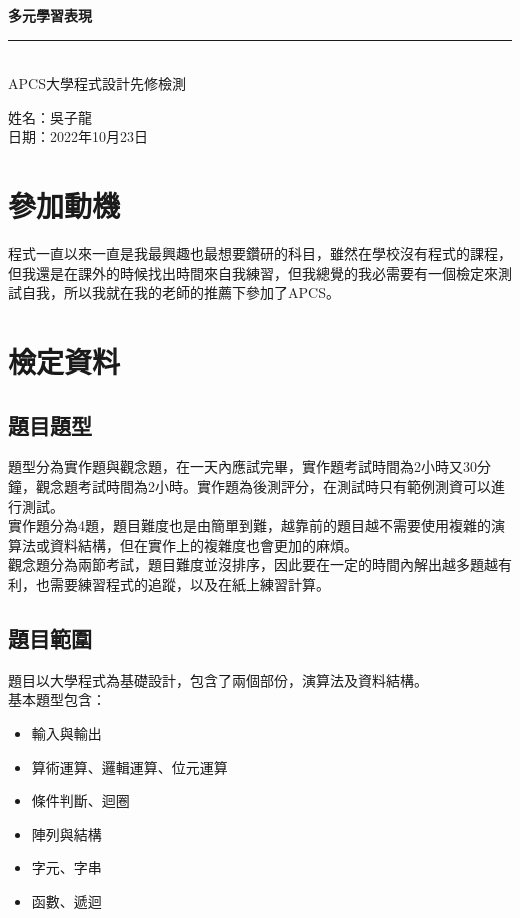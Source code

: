 \documentclass[a4paper, 18pt]{article}
\begin{document}
\begin{center}

\vspace*{7cm}
\Huge \textbf{多元學習表現}\\
\rule[10pt]{12cm}{0.05em}\\
\Huge {APCS大學程式設計先修檢測}\\

\vspace{10cm}

\begin{flushright}
\Large 姓名：吳子龍\\
\Large 日期：2022年10月23日\\
\end{flushright}

\end{center}

\newpage
\renewcommand{\contentsname}{目錄}
\tableofcontents
\newpage

\section{參加動機}
程式一直以來一直是我最興趣也最想要鑽研的科目，雖然在學校沒有程式的課程，但我還是在課外的時候找出時間來自我練習，但我總覺的我必需要有一個檢定來測試自我，所以我就在我的老師的推薦下參加了APCS。

\section{檢定資料}
\subsection{題目題型}
題型分為實作題與觀念題，在一天內應試完畢，實作題考試時間為2小時又30分鐘，觀念題考試時間為2小時。實作題為後測評分，在測試時只有範例測資可以進行測試。\\
實作題分為4題，題目難度也是由簡單到難，越靠前的題目越不需要使用複雜的演算法或資料結構，但在實作上的複雜度也會更加的麻煩。\\
觀念題分為兩節考試，題目難度並沒排序，因此要在一定的時間內解出越多題越有利，也需要練習程式的追蹤，以及在紙上練習計算。
\subsection{題目範圍}
題目以大學程式為基礎設計，包含了兩個部份，演算法及資料結構。\\
\noindent 基本題型包含：
\begin{itemize}
    \item 輸入與輸出
    \item 算術運算、邏輯運算、位元運算
    \item 條件判斷、迴圈
    \item 陣列與結構
    \item 字元、字串
    \item 函數、遞迴
\end{itemize}
\end{document}
